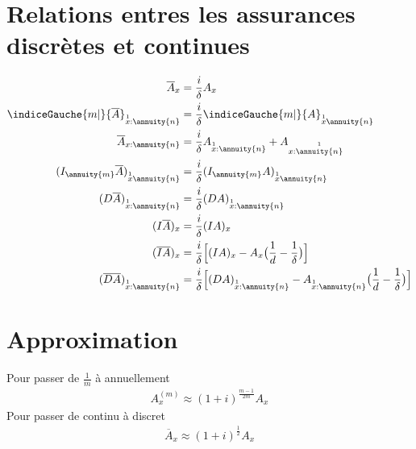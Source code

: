 \section{Relations entres les assurances discrètes et continues}
\begin{align*}
\overline{A}_x &= \frac{i}{\delta}A_x \\
\indiceGauche{m|}{\overline{A}}_{\overset{1}{x}:\annuity{n}} &= \frac{i}{\delta} \indiceGauche{m|}{A}_{\overset{1}{x}\annuity{n}} \\
\overline{A}_{x:\annuity{n}} &= \frac{i}{\delta} A_{\overset{1}{x}:\annuity{n}} + A_{x:\overset{1}{\annuity{n}}} \\
(I_{\annuity{m}}\overline{A})_{\overset{1}{x}\annuity{n}} &= \frac{i}{\delta} (I_{\annuity{m}}A)_{\overset{1}{x}\annuity{n}} \\
(D\overline{A})_{\overset{1}{x}:\annuity{n}} &= \frac{i}{\delta}(DA)_{\overset{1}{x}:\annuity{n}} \\
(I\overline{A})_x &= \frac{i}{\delta}(IA)_x \\
(\overline{IA})_x &= \frac{i}{\delta}\Big[ (IA)_x - A_x\big( \frac{1}{d} - \frac{1}{\delta}\big) \Big]  \\
(\overline{DA})_{\overset{1}{x}:\annuity{n}} &= \frac{i}{\delta}\Big[ (DA)_{\overset{1}{x}:\annuity{n}} - A_{\overset{1}{x}:\annuity{n}}\big( \frac{1}{d} - \frac{1}{\delta}\big) \Big]  \\
\end{align*}

\section{Approximation}
Pour passer de $\frac{1}{m}$ à annuellement
\begin{align*}
A_x^{(m)} \approx (1+i)^{\frac{m-1}{2m}}A_x
\end{align*}
Pour passer de continu à discret
\begin{align*}
\overline{A}_x \approx (1+i)^{\frac{1}{2}}A_x
\end{align*}
